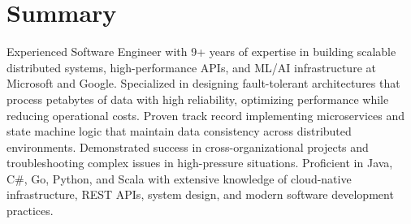 \section{Summary}
\footnotesize{Experienced Software Engineer with 9+ years of expertise in building scalable distributed systems, high-performance APIs, and ML/AI infrastructure at Microsoft and Google. Specialized in designing fault-tolerant architectures that process petabytes of data with high reliability, optimizing performance while reducing operational costs. Proven track record implementing microservices and state machine logic that maintain data consistency across distributed environments. Demonstrated success in cross-organizational projects and troubleshooting complex issues in high-pressure situations. Proficient in Java, C\#, Go, Python, and Scala with extensive knowledge of cloud-native infrastructure, REST APIs, system design, and modern software development practices.}
